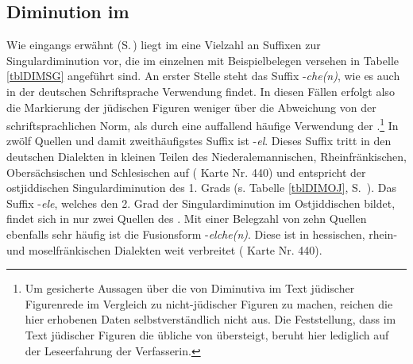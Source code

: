  \subsection{Diminution im }\label{dimsg}
 
Wie eingangs erwähnt (S.\,\pageref{AnzahlDIM}) liegt im  eine Vielzahl an Suffixen zur Singulardiminution vor, die im einzelnen mit Beispielbelegen versehen in Tabelle \ref{tblDIMSG} angeführt sind. An erster Stelle steht das Suffix -\textit{che(n)}, wie es auch in der deutschen Schriftsprache Verwendung findet. In diesen Fällen erfolgt also die Markierung der jüdischen Figuren weniger über die Abweichung von der schriftsprachlichen Norm, als durch eine auffallend häufige Verwendung der .\footnote{Um gesicherte Aussagen über die  von Diminutiva im Text jüdischer Figurenrede im Vergleich zu nicht-jüdischer Figuren zu machen, reichen die hier erhobenen Daten selbstverständlich nicht aus. Die Feststellung, dass  im Text  jüdischer Figuren die übliche  von  übersteigt, beruht hier lediglich auf der Leseerfahrung der Verfasserin.} In zwölf Quellen und damit zweithäufigstes Suffix ist -\textit{el}. Dieses Suffix tritt in den deutschen Dialekten in kleinen Teilen des Niederalemannischen, Rheinfränkischen, Obersächsischen und Schlesischen auf ( Karte Nr. 440) und entspricht der ostjiddischen Singulardiminution des 1. Grads (s. Tabelle \ref{tblDIMOJ}, S.\, \pageref{tblDIMOJ}). Das Suffix -\textit{ele}, welches den 2. Grad der Singulardiminution im Ostjiddischen bildet, findet sich in nur zwei Quellen des . Mit einer Belegzahl von zehn Quellen ebenfalls sehr häufig ist die Fusionsform -\textit{elche(n)}. Diese ist in hessischen, rhein- und moselfränkischen Dialekten weit verbreitet ( Karte Nr. 440). 


